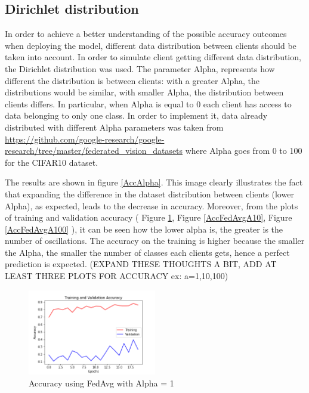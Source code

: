 \documentclass[twocolumn]{article}
\begin{document}
\subsection{Dirichlet distribution}

In order to achieve a better understanding of the possible accuracy outcomes when deploying the model, different data distribution between clients should be taken into account. In order to simulate client getting different data distribution, the Dirichlet distribution was used. The parameter Alpha, represents how different the distribution is between clients: with a greater Alpha, the distributions 
would be similar, with smaller Alpha, the distribution between clients differs.
In particular, when Alpha is equal to 0 each client has access to data belonging to only one class.
In order to implement it, data already distributed with different Alpha parameters was taken from \url{https://github.com/google-research/google-research/tree/master/federated_vision_datasets} where Alpha goes from 0 to 100 for the CIFAR10 dataset.



The results are shown in figure \ref{AccAlpha}. This image clearly illustrates the fact that expanding the difference in the dataset distribution between clients (lower Alpha), as expected, leads to the decrease in accuracy. 
Moreover, from the plots of training and validation accuracy ( Figure \ref{AccFedAvgA1}, Figure \ref{AccFedAvgA10}, Figure \ref{AccFedAvgA100} ), it can be seen how the lower alpha is, the greater is the number of oscillations.
The accuracy on the training is higher because the smaller the Alpha, the smaller the number of classes each clients gets, hence a perfect prediction is expected. 
(EXPAND THESE THOUGHTS A BIT, ADD AT LEAST THREE PLOTS FOR ACCURACY ex: a=1,10,100)

\begin{figure}
    \centering
    \includegraphics[width=0.5\textwidth,height=.3\textheight]{2_AccuracyFedAvg_A1.png}
    \caption{Accuracy using FedAvg with Alpha = 1}
     \label{AccFedAvgA1} 
\end{figure}
\end{document}
